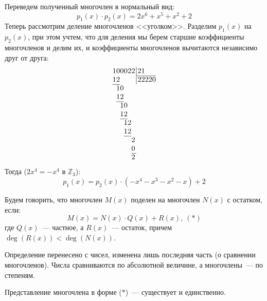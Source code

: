 \documentclass[russian]{lecture-notes}
\theoremstyle{definition}
\DeclareMathOperator{\Deg}{deg}
\newcommand{\D}[1]{\Deg(#1)}
\begin{document}
\begin{example}
        \noindent Переведем полученный многочлен в нормальный вид:
        \[
            p_1(x) \cdot p_2(x) = 2x^6 + x^5 + x^2 + 2
        \]
        Теперь рассмотрим деление многочленов <<уголком>>. Разделим $p_1(x)$ на $p_2(x)$, при этом учтем, что для деления мы берем старшие коэффициенты многочленов и делим их, и коэффициенты многочленов вычитаются независимо друг от друга:
        \[
            \arraycolsep=0.01em
            \begin{array}{rrrrrr@{\,}r|l}
                1&0&0&0&2&2&&\,21\\
                \cline{8-8}
                1&2&&&&&&\,22220\\
                \cline{1-2}
                &1&0&&&\\
                &1&2&&&\\
                \cline{2-3}
                &&1&0&&\\
                &&1&2&&\\
                \cline{3-4}
                &&&1&2&\\
                &&&1&2&\\
                \cline{4-5}
                &&&&&2\\
                &&&&&0\\
                \cline{6-6}
                &&&&&2
            \end{array}
        \]
        Тогда ($2x^4 = -x^4$ в $\mathbb{Z}_3$):
        \[
            p_1(x) = p_2(x) \cdot (-x^4 - x^3 - x^2 - x) + 2
        \]

    \end{example}

    \begin{definition}
        Будем говорить, что многочлен $M(x)$ поделен на многочлен $N(x)$ с остатком, если:
        \[
            M(x) = N(x) \cdot Q(x) + R(x), \ (\ast)
        \]
        где $Q(x)$~--- частное, а $R(x)$~--- остаток, причем $\D{R(x)} < \D{N(x)}$.
    \end{definition}

    \begin{note}
        Определение перенесено с чисел, изменена лишь последняя часть (о сравнении многочленов). Числа сравниваются по абсолютной величине, а многочлены~--- по степеням.
    \end{note}

    \begin{theorem}
        Представление многочлена в форме ($\ast$)~--- существует и единственно.
    \end{theorem}
\end{document}
